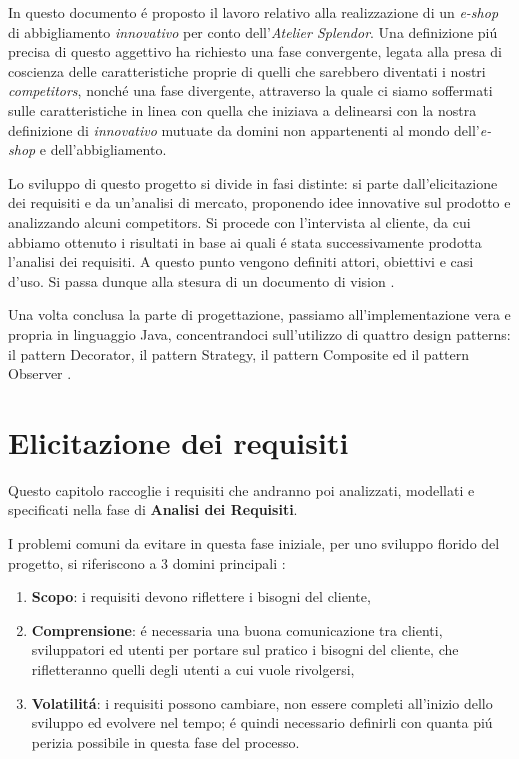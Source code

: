 \documentclass[12pt]{article}
\begin{document}
\newpage

\tableofcontents


\newpage

\abstract{}
In questo documento \'e proposto il lavoro relativo alla realizzazione di un \textit{e-shop} di abbigliamento \textit{innovativo} per conto dell'{\em Atelier Splendor}. Una definizione pi\'u precisa di questo aggettivo ha richiesto una fase convergente, legata alla presa di coscienza delle caratteristiche proprie di quelli che sarebbero diventati i nostri \textit{competitors}, nonch\'e una fase divergente, attraverso la quale ci siamo soffermati sulle caratteristiche in linea con quella che iniziava a delinearsi con la nostra definizione di \textit{innovativo} mutuate da domini non appartenenti al mondo dell'\textit{e-shop} e dell'abbigliamento.

Lo sviluppo di questo progetto si divide in fasi distinte: si parte dall'elicitazione dei requisiti \cite{elicitation_tools} e da un'analisi di mercato, proponendo idee innovative sul prodotto e analizzando alcuni competitors. Si procede con l'intervista al cliente, da cui abbiamo ottenuto i risultati in base ai quali \'e stata successivamente prodotta l'analisi dei requisiti. A questo punto vengono definiti attori, obiettivi e casi d'uso. Si passa dunque alla stesura di un documento di vision \cite{up-riferimento}.

Una volta conclusa la parte di progettazione, passiamo all'implementazione vera e propria in linguaggio Java, concentrandoci sull'utilizzo di quattro design patterns: il pattern Decorator, il pattern Strategy, il pattern Composite ed il pattern Observer \cite{gof_sunt}.

\newpage

\section{Elicitazione dei requisiti}
Questo capitolo raccoglie i requisiti che andranno poi analizzati, modellati e specificati nella fase di \textbf{Analisi dei Requisiti}. 

I problemi comuni da evitare in questa fase iniziale, per uno sviluppo florido del progetto, si riferiscono a 3 domini principali \cite{up-riferimento}:
\begin{enumerate}
    \item \textbf{Scopo}: i requisiti devono riflettere i bisogni del cliente,
    \item \textbf{Comprensione}: \'e necessaria una buona comunicazione tra clienti, sviluppatori ed utenti per portare sul pratico i bisogni del cliente, che rifletteranno quelli degli utenti a cui vuole rivolgersi,
    \item \textbf{Volatilit\'a}: i requisiti possono cambiare, non essere completi all'inizio dello sviluppo ed evolvere nel tempo; \'e quindi necessario definirli con quanta pi\'u perizia possibile in questa fase del processo.
\end{enumerate}
\end{document}
